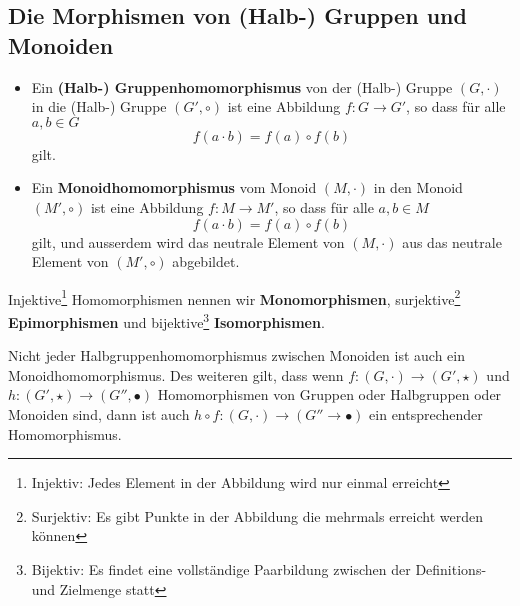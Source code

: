 \subsection{Die Morphismen von (Halb-) Gruppen und Monoiden}
\begin{itemize}
	\item Ein \textbf{(Halb-) Gruppenhomomorphismus} von der (Halb-) Gruppe $(G, \cdot)$ in die (Halb-) Gruppe $(G', \circ)$ ist eine Abbildung $f: G \rightarrow G'$, so dass für alle $a,b \in G$ 
	$$f(a \cdot b) = f(a) \circ f(b)$$
	gilt.
	\item Ein \textbf{Monoidhomomorphismus} vom Monoid $(M, \cdot)$ in den Monoid $(M', \circ)$ ist eine Abbildung $f: M \rightarrow M'$, so dass für alle $a,b \in M$
	$$ f(a\cdot b) = f(a) \circ f(b)$$
	gilt, und ausserdem wird das neutrale Element von $(M, \cdot)$ aus das neutrale Element von $(M', \circ)$ abgebildet.
\end{itemize}
Injektive\footnote{Injektiv: Jedes Element in der Abbildung wird nur einmal erreicht} Homomorphismen nennen wir \textbf{Monomorphismen}, surjektive\footnote{Surjektiv: Es gibt Punkte in der Abbildung die mehrmals erreicht werden können} \textbf{Epimorphismen} und bijektive\footnote{Bijektiv: Es findet eine vollständige Paarbildung zwischen der Definitions- und Zielmenge statt} \textbf{Isomorphismen}.
\begin{bem}
Nicht jeder Halbgruppenhomomorphismus zwischen Monoiden ist auch ein Monoidhomomorphismus. Des weiteren gilt, dass wenn $f: (G, \cdot) \rightarrow (G', \star) $ und $h: (G', \star) \rightarrow (G'', \bullet) $ Homomorphismen von Gruppen oder Halbgruppen oder Monoiden sind, dann ist auch $h \circ f : (G, \cdot) \rightarrow (G'' \rightarrow \bullet)$ ein entsprechender Homomorphismus.
\end{bem}

